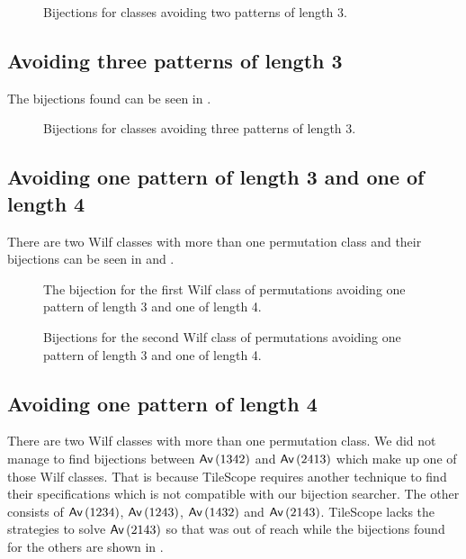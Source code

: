 \begin{figure}[ht!]
    \centering
    
    \caption{Bijections for classes avoiding two patterns of length $3$.}
    \label{fig:2x3bi}
\end{figure}

\subsection{Avoiding three patterns of length 3}
The bijections found can be seen in . 
\begin{figure}[ht!]
    \centering
    
    \caption{Bijections for classes avoiding three patterns of length $3$.}
    \label{fig:3x3bi}
\end{figure}


\subsection{Avoiding one pattern of length 3 and one of length 4}
There are two Wilf classes with more than one permutation class and their bijections can be seen in  and .

\begin{figure}[ht!]
    \centering
    
    \caption{The bijection for the first Wilf class of permutations avoiding one pattern of length 3 and one of length 4.}
    \label{fig:1x31x4bi_1}
\end{figure}

\begin{figure}[ht!]
    \centering
    
    \caption{Bijections for the second Wilf class of permutations avoiding one pattern of length 3 and one of length 4.}
    \label{fig:1x31x4bi_2}
\end{figure}

\subsection{Avoiding one pattern of length 4}
There are two Wilf classes with more than one permutation class. We did not manage to find bijections between $\textsf{Av}\left(1342\right)$ and $\textsf{Av}\left(2413\right)$ which make up one of those Wilf classes. That is because TileScope requires another technique to find their specifications which is not compatible with our bijection searcher. The other consists of $\textsf{Av}\left(1234\right)$, $\textsf{Av}\left(1243\right)$, $\textsf{Av}\left(1432\right)$ and $\textsf{Av}\left(2143\right)$. TileScope lacks the strategies to solve $\textsf{Av}\left(2143\right)$ so that was out of reach while the bijections found for the others are shown in .

